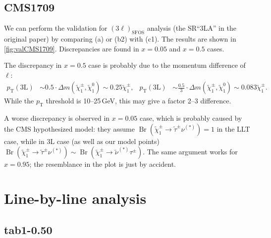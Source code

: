 \documentclass[a4paper,10pt,captions=tableheading,DIV=14]{scrartcl}
\numberwithin{equation}{section}
\newcommand\w[1]{_{\mathrm{#1}}}
\DeclareMathOperator{\Br}{\mathrm{Br}}
\newcommand\neut  [1][\relax]{{\tilde\chi^0_{#1}}}
\newcommand\charPM[1][\relax]{{\tilde\chi^\pm_{#1}}}
\begin{document}
\subsection{CMS1709}
We can perform the validation for $(3\ell)\w{SFOS}$ analysis (the SR``3LA'' in the original paper) by comparing (a) or (b2) with (c1).
The results are shown in \cref{fig:valCMS1709}.
Discrepancies are found in $x=0.05$ and $x=0.5$ cases.

The discrepancy in $x=0.5$ case is probably due to the momentum difference of $\ell$:
\begin{align}
 p\w T(\text{3L}) &\sim 0.5\cdot\Delta m(\charPM[1],\neut[1])\sim 0.25\charPM[1],
&
 p\w T(\text{3L}) &\sim \frac{0.5}{3}\cdot\Delta m(\charPM[1],\neut[1])\sim 0.083\charPM[1].
\end{align}
While the $p\w T$ threshold is 10--25\,GeV, this may give a factor 2--3 difference.

A worse discrepancy is observed in $x=0.05$ case, which is probably caused by the CMS hypothesized model: they assume $\Br(\charPM[1]\to\tilde\tau^\pm\nu^{(*)})=1$ in the LLT case, while in 3L case (as well as our model points) $\Br(\charPM[1]\to\tilde\tau^\pm\nu^{(*)})\sim\Br(\charPM[1]\to\tilde\nu^{(*)}\tau^\pm)$.
The same argument works for $x=0.95$; the resemblance in the plot is just by accident.

\clearpage

\section{Line-by-line analysis}
\subsection{tab1-0.50}
\end{document}
